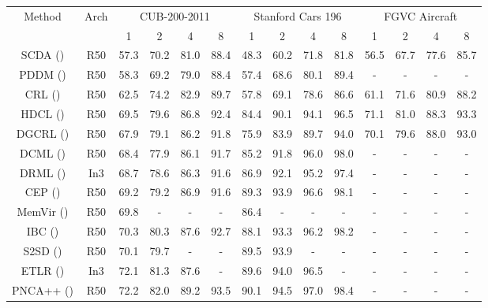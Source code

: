 \documentclass[letterpaper]{article} %
\begin{document}
\begin{table}\centering

\begin{tabular}{c|c||cccc|cccc|cccc}
\hline
\hline
\multirow{2.5}{*}{Method} & \multirow{2.5}{*}{Arch}& \multicolumn{4}{|c|}{CUB-200-2011}&  \multicolumn{4}{c|}{Stanford Cars 196} & \multicolumn{4}{c}{FGVC Aircraft}\\
\cline{3-14}
&  & 1&2&4&8& 1&2&4&8& 1&2&4&8 \\
\hline
\hline
SCDA (\citeauthor{DBLP:journals/tip/WeiLWZ17})& R50& 57.3 & 70.2 & 81.0 &88.4& 48.3& 60.2&71.8&81.8& 56.5& 67.7&77.6&85.7\\
PDDM (\citeauthor{DBLP:journals/tog/Bala15})& R50& 58.3&69.2&79.0&88.4&57.4&68.6&80.1&89.4&-&-&-&-\\

CRL (\citeauthor{DBLP:conf/ijcai/ZhengJSWHY18}) & R50& 62.5 & 74.2 & 82.9 &89.7& 57.8& 69.1&78.6&86.6& 61.1& 71.6&80.9&88.2\\
HDCL (\citeauthor{DBLP:journals/ijon/ZengLWZCL21}) & R50& 69.5 & 79.6 & 86.8 &92.4& 84.4& 90.1&94.1&96.5& 71.1& 81.0&88.3&93.3\\
\hline
\hline
DGCRL (\citeauthor{DBLP:conf/aaai/ZhengJSZWH19})& R50& 67.9 & 79.1 & 86.2 &91.8& 75.9& 83.9&89.7&94.0& 70.1& 79.6&88.0&93.0\\
DCML (\citeauthor{DBLP:conf/cvpr/ZhengWL021}) & R50& 68.4 & 77.9 & 86.1 &91.7& 85.2& 91.8&96.0&98.0&-& -& -&-\\
DRML (\citeauthor{DBLP:conf/iccv/ZhengZL021}) & In3 & 68.7 & 78.6 & 86.3 & 91.6 & 86.9 & 92.1& 95.2& 97.4 & -& -& -&-\\
CEP (\citeauthor{DBLP:conf/eccv/BoudiafRZGPPA20})& R50&69.2 & 79.2 & 86.9 &91.6& 89.3& 93.9&96.6&98.1&  -& -& -&-\\
MemVir (\citeauthor{DBLP:conf/iccv/KoGK21}) & R50 & 69.8&-&-&-& 86.4&-&-&-&- &- &- &-\\
IBC (\citeauthor{DBLP:conf/icml/SeidenschwarzEL21}) & R50 & 70.3 & 80.3& 87.6& 92.7& 88.1& 93.3& 96.2& 98.2& - &- &- &- \\
S2SD (\citeauthor{DBLP:conf/icml/RothMOCG21})& R50& 70.1 & 79.7& -&-&89.5& 93.9&-&-&- &- &- &-\\
ETLR (\citeauthor{DBLP:conf/cvpr/KimKCK21})& In3& 72.1 & 81.3 & 87.6 &-& 89.6& 94.0&96.5&-&-& -& -&- \\
PNCA++ (\citeauthor{DBLP:conf/eccv/TehDT20})& R50& 72.2 & 82.0 & 89.2 &93.5& 90.1& 94.5&97.0&98.4&-& -& -&-\\
\hline
\hline



\end{tabular}
\end{table}
\end{document}
